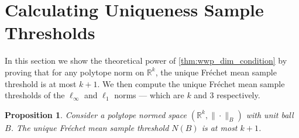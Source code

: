 \documentclass[10pt]{article}
\newtheorem{proposition}[theorem]{Proposition}
\theoremstyle{definition}
\theoremstyle{remark}
\newcommand{\R}{\mathbb{R}}
\begin{document}
	\section{Calculating Uniqueness Sample Thresholds} \label{sec:calculating_examples}
	
	In this section we show the theoretical power of \cref{thm:wwp_dim_condition} by proving that for any polytope norm on $\R^k$, the unique Fr\'echet mean sample threshold is at most $k+1$. We then compute the unique Fr\'echet mean sample thresholds of the $\ell_\infty$ and $\ell_1$ norms --- which are $k$ and 3 respectively.
	
	\begin{proposition}\label{prop:threshold_bound}
		Consider a polytope normed space $(\R^k, \|\cdot\|_B)$ with unit ball $B$. The unique Fr\'echet mean sample threshold $N(B)$ is at most $k+1$.
	\end{proposition}
	
\end{document}
